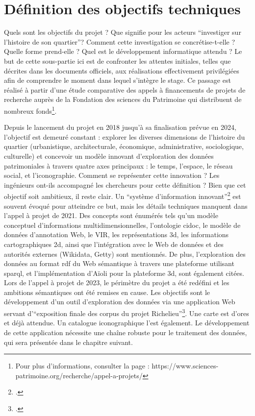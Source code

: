 \section{Définition des objectifs techniques}
Quels sont les objectifs du projet ? Que signifie pour les acteurs \enquote{investiger sur l'histoire de son quartier}? Comment cette investigation se concrétise-t-elle ?  Quelle forme prend-elle ? Quel est le développement informatique attendu ? Le but de cette sous-partie ici est de confronter les attentes initiales, telles que décrites dans les documents officiels, aux réalisations effectivement privilégiées afin de comprendre le moment dans lequel s'intègre le stage. Ce passage est réalisé à partir d'une étude comparative des appels à financements de projets de recherche auprès de la Fondation des sciences du Patrimoine qui distribuent de nombreux fonds\footnote{Pour plus d'informations, consulter la page : https://www.sciences-patrimoine.org/recherche/appel-a-projets/ }. 

Depuis le lancement du projet en 2018 jusqu'à sa finalisation prévue en 2024, l'objectif est demeuré constant : explorer les diverses dimensions de l'histoire du quartier (urbanistique, architecturale, économique, administrative, sociologique, culturelle) et concevoir un modèle innovant d'exploration des données patrimoniales à travers quatre axes principaux : le temps, l'espace, le réseau social, et l'iconographie. Comment se représenter cette innovation ? Les ingénieurs ont-ils accompagné les chercheurs pour cette définition ? Bien que cet objectif soit ambitieux, il reste clair. Un \enquote{système d'information innovant}\footcite{PROJETFondation2021} est souvent évoqué pour atteindre ce but, mais les détails techniques manquent dans l'appel à projet de 2021. Des concepts sont énumérés tels qu'un modèle conceptuel d'informations multidimensionnelles, l'ontologie \acrshort{cidoc}, le modèle de données d'annotation Web, le VIR, les représentations \acrshort{3d}, les informations cartographiques \acrshort{2d}, ainsi que l'intégration avec le Web de données et des autorités externes (Wikidata, Getty) sont mentionnés. De plus, l'exploration des données au format \acrshort{rdf} du Web sémantique à travers une plateforme utilisant \acrshort{sparql}, et l'implémentation d'Aïoli pour la plateforme \acrshort{3d}, sont également citées. 
Lors de l'appel à projet de 2023, le périmètre du projet a été redéfini et les ambitions sémantiques ont été remises en cause. Les objectifs sont le développement d'un outil d'exploration des données via une application Web servant d'\enquote{exposition finale des corpus du projet Richelieu}\footcite{PROJETFondation2023}. Une carte est d'ores et déjà attendue. Un catalogue iconographique l'est également. Le développement de cette application nécessite une chaîne robuste pour le traitement des données, qui sera présentée dans le chapitre suivant.

